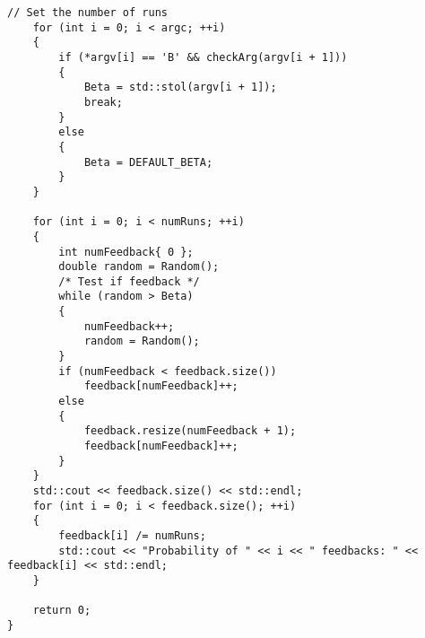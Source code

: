 \begin{lstlisting}[style=CStyle]
    // Set the number of runs
    for (int i = 0; i < argc; ++i)
    {
        if (*argv[i] == 'B' && checkArg(argv[i + 1]))
        {
            Beta = std::stol(argv[i + 1]);
            break;
        }
        else
        {
            Beta = DEFAULT_BETA;
        }
    }
    
    for (int i = 0; i < numRuns; ++i)
    {
        int numFeedback{ 0 };
        double random = Random();
        /* Test if feedback */
        while (random > Beta)
        {
            numFeedback++;
            random = Random();
        }
		if (numFeedback < feedback.size())
            feedback[numFeedback]++;
        else
        {
			feedback.resize(numFeedback + 1);
			feedback[numFeedback]++;
        }
    }
    std::cout << feedback.size() << std::endl;
    for (int i = 0; i < feedback.size(); ++i)
    {
		feedback[i] /= numRuns;
		std::cout << "Probability of " << i << " feedbacks: " << feedback[i] << std::endl;
    }
      
	return 0;
}
\end{lstlisting}